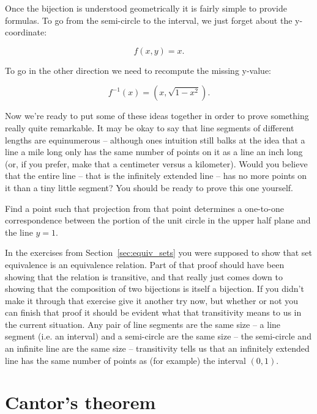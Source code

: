 Once the bijection is understood geometrically it is fairly simple to provide
formulas.  To go from the semi-circle to the interval, we just forget
about the y-coordinate:

\[ f(x, y) = x. \]


To go in the other direction we need to recompute the missing y-value:

\[ f^{-1}(x) = (x, \sqrt{1 - x^2}).\]

Now we're ready to put some of these ideas together in order to prove
something really quite remarkable.  It may be okay to say that line segments
of different lengths are equinumerous -- although ones intuition still balks
at the idea that a line a mile long only has the same number of points on
it as a line an inch long (or, if you prefer, make that a centimeter versus
a kilometer).  Would you believe that the entire line -- that is the infinitely
extended line -- has no more points on it than a tiny little segment? You
should be ready to prove this one yourself.

\begin{exer}
Find a point such that projection from that point determines a
one-to-one correspondence between the portion of the unit circle in the upper
half plane and the line $y = 1$.  
\end{exer}

In the exercises from Section~\ref{sec:equiv_sets} you were supposed 
to show that set
equivalence is an equivalence relation.  Part of that proof should have been
showing that the relation is transitive, and that really just comes down to
showing that the composition of two bijections is itself a bijection.  If you
didn't make it through that exercise give it another try now, but whether
or not you can finish that proof it should be evident what that transitivity
means to us in the current situation.  Any pair of line segments are the same
size -- a line segment (i.e. an interval) and a semi-circle are the same size --
the semi-circle and an infinite line are the same size -- transitivity tells us that
an infinitely extended line has the same number of points as (for example)
the interval $(0, 1)$.

\clearpage




\newpage

\section{Cantor's theorem}
\label{sec:cantors_thm}

